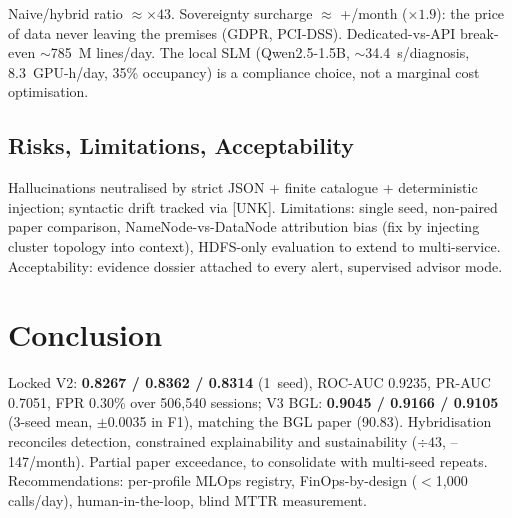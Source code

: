 \documentclass[12pt,a4paper]{report}
\begin{document}
Naive/hybrid ratio $\approx \times 43$. Sovereignty surcharge $\approx$ +/month ($\times 1{.}9$): the price of data never leaving the premises (GDPR, PCI-DSS). Dedicated-vs-API break-even $\sim$785~M lines/day. The local SLM (Qwen2.5-1.5B, $\sim$34.4~s/diagnosis, 8.3~GPU-h/day, 35\% occupancy) is a compliance choice, not a marginal cost optimisation.

\subsection{Risks, Limitations, Acceptability}

Hallucinations neutralised by strict JSON + finite catalogue + deterministic injection; syntactic drift tracked via [UNK]. Limitations: single seed, non-paired paper comparison, NameNode-vs-DataNode attribution bias (fix by injecting cluster topology into context), HDFS-only evaluation to extend to multi-service. Acceptability: evidence dossier attached to every alert, supervised advisor mode.

\section{Conclusion}

Locked V2: \textbf{0.8267 / 0.8362 / 0.8314} (1~seed), ROC-AUC 0.9235, PR-AUC 0.7051, FPR 0.30\% over 506,540 sessions; V3 BGL: \textbf{0.9045 / 0.9166 / 0.9105} (3-seed mean, $\pm$0.0035 in F1), matching the BGL paper (90.83). Hybridisation reconciles detection, constrained explainability and sustainability ($\div 43$, --147/month). Partial paper exceedance, to consolidate with multi-seed repeats. Recommendations: per-profile MLOps registry, FinOps-by-design ($<$1,000 calls/day), human-in-the-loop, blind MTTR measurement.
\end{document}
